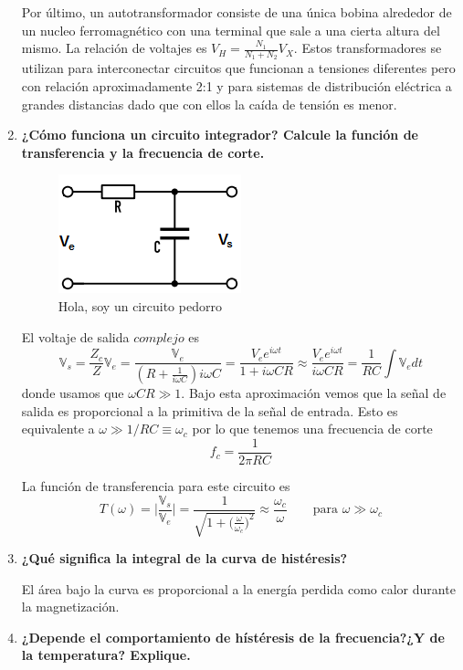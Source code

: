 \documentclass[a4paper,10pt,fleqn,oneside]{article}
\begin{document}
\begin{enumerate}[1.]
	Por último, un autotransformador consiste de una única bobina alrededor de un nucleo ferromagnético con una terminal que sale a una cierta altura del mismo. La relación de voltajes es $V_H=\frac{N_1}{N_1+N_2}V_X$. Estos transformadores se utilizan para interconectar circuitos que funcionan a tensiones diferentes pero con relación aproximadamente 2:1 y para sistemas de distribución eléctrica a grandes distancias dado que con ellos la caída de tensión es menor.
	
	\item \textbf{¿Cómo funciona un circuito integrador? Calcule la función de transferencia y la frecuencia de corte.} 
	
	\begin{figure}[h]
		\centering
		\includegraphics[scale=0.75]{integrador.png}
		\caption{Hola, soy un circuito pedorro}
		\label{Int}
	\end{figure}
	
	El voltaje de salida $complejo$ es \[\mathbb{V}_s = \frac{Z_c}{Z}\mathbb{V}_e = \frac{\mathbb{V}_e}{(R+\frac{1}{i\omega C})i\omega C} = \frac{V_ee^{i\omega t}}{1+i\omega CR}\approx \frac{V_e e^{i\omega t} }{i\omega C R} = \frac{1}{RC}\int \mathbb{V}_e dt\]
	donde usamos que $\omega CR\gg 1$. Bajo esta aproximación vemos que la señal de salida es proporcional a la primitiva de la señal de entrada. Esto es equivalente a $\omega \gg 1/RC \equiv \omega_c$ por lo que tenemos una frecuencia de corte \[ f_c = \frac{1}{2\pi RC} \]
	
	La función de transferencia para este circuito es \[ T(\omega) = \Big| \frac{\mathbb{V}_s}{\mathbb{V}_e} \Big| = \frac{1}{\sqrt{1+\big( \frac{\omega}{\omega_c} \big)^2}}\approx \frac{\omega_c}{\omega} \qquad \text{para } \omega\gg \omega_c \]
	
	\item \textbf{¿Qué significa la integral de la curva de histéresis?}
	
	El área bajo la curva es proporcional a la energía perdida como calor durante la magnetización. 
	\item \textbf{¿Depende el comportamiento de hístéresis de la frecuencia?¿Y de la temperatura? Explique.}
	
\end{enumerate}
\end{document}
